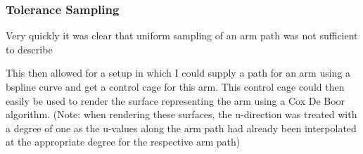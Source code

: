 \documentclass[twocolumn]{article}
\begin{document}
\subsubsection{Tolerance Sampling}

Very quickly it was clear that uniform sampling of an arm path was not sufficient to describe 

This then allowed for a setup in which I could supply a path for an arm using a bspline curve and get a control cage for this arm. This control cage could then easily be used to render the surface representing the arm using a Cox De Boor algorithm. (Note: when rendering these surfaces, the u-direction was treated with a degree of one as the u-values along the arm path had already been interpolated at the appropriate degree for the respective arm path)
\end{document}
